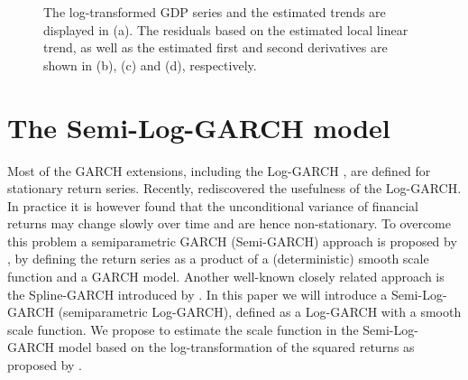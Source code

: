 \begin{figure}[htbp]
	\caption{\label{fig:ex2} The log-transformed GDP series and the estimated trends are displayed in (a). The residuals based on the estimated local linear trend, as well as the estimated first and second derivatives are shown in (b), (c) and (d), respectively.}
\end{figure}

\section{The Semi-Log-GARCH model} \label{sec:SemiLogGARCH}

Most of the GARCH extensions, including the Log-GARCH \citep{pantula1986, geweke1986, milhoj1987multi}, are defined for stationary return series. Recently, \citet{francq2013garch} rediscovered the usefulness of the Log-GARCH.
In practice it is however found that the unconditional variance of financial returns may change slowly over time and are hence non-stationary. To overcome this problem a semiparametric GARCH (Semi-GARCH) approach is proposed by \citet{feng2004sim}, by defining the return series as a product of a (deterministic) smooth scale function and a GARCH model. 
Another well-known closely related approach is the Spline-GARCH introduced by \citet{engle2008spline}. In this paper we will introduce a Semi-Log-GARCH (semiparametric Log-GARCH), defined as a Log-GARCH with a smooth scale function. We propose to estimate the scale function in the Semi-Log-GARCH model based on the log-transformation of the squared returns as proposed by \citet{engle2008spline}.  

